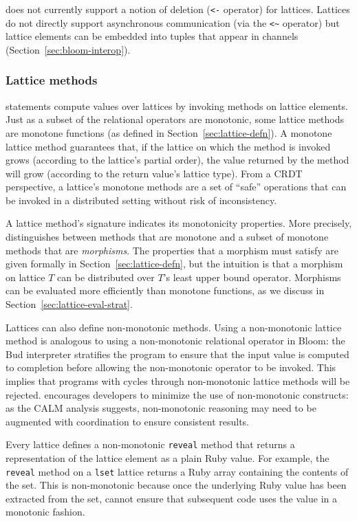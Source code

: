 \lang does not currently support a notion of deletion (\verb|<-| operator) for
lattices. Lattices do not directly support asynchronous communication (via the
\verb|<~| operator) but lattice elements can be embedded into tuples that appear
in channels (Section~\ref{sec:bloom-interop}).

\subsubsection{Lattice methods}
\lang statements compute values over lattices by invoking methods on lattice
elements. Just as a subset of the relational operators are monotonic, some
lattice methods are monotone functions (as defined in
Section~\ref{sec:lattice-defn}). A monotone lattice method guarantees that, if
the lattice on which the method is invoked grows (according to the lattice's
partial order), the value returned by the method will grow (according to the
return value's lattice type). From a CRDT perspective, a lattice's monotone
methods are a set of ``safe'' operations that can be invoked in a distributed
setting without risk of inconsistency.

A lattice method's signature indicates its monotonicity properties. More
precisely, \lang distinguishes between methods that are monotone and a subset of
monotone methods that are \emph{morphisms}. The properties that a morphism must
satisfy are given formally in Section~\ref{sec:lattice-defn}, but the intuition
is that a morphism on lattice $T$ can be distributed over $T$'s least upper
bound operator. Morphisms can be evaluated more efficiently than monotone
functions, as we discuss in Section~\ref{sec:lattice-eval-strat}.

Lattices can also define non-monotonic methods. Using a non-monotonic lattice
method is analogous to using a non-monotonic relational operator in Bloom: the
Bud interpreter stratifies the program to ensure that the input value is
computed to completion before allowing the non-monotonic operator to be invoked. This
implies that programs with cycles through non-monotonic lattice methods will be
rejected. \lang encourages developers to minimize the use of non-monotonic
constructs: as the CALM analysis suggests, non-monotonic reasoning may need to
be augmented with coordination to ensure consistent results.

Every lattice defines a non-monotonic \texttt{reveal} method that returns a
representation of the lattice element as a plain Ruby value. For example, the
\texttt{reveal} method on a \texttt{lset} lattice returns a Ruby array
containing the contents of the set. This is non-monotonic because once the
underlying Ruby value has been extracted from the set, \lang cannot ensure that
subsequent code uses the value in a monotonic fashion.

